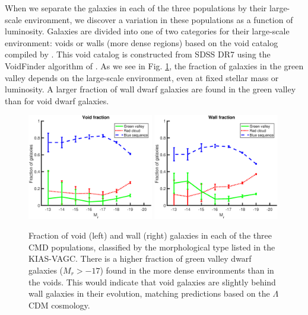 When we separate the galaxies in each of the three populations by their 
large-scale environment, we discover a variation in these populations as a 
function of luminosity.  Galaxies are divided into one of two categories for 
their large-scale environment: voids or walls (more dense regions) based on the 
void catalog compiled by \cite{Pan12}.  This void catalog is constructed from 
SDSS DR7 using the VoidFinder algorithm of \cite{Hoyle02}.  As we see in Fig. 
\ref{fig:Mr_bin}, the fraction of galaxies in the green valley depends on the 
large-scale environment, even at fixed stellar mass or luminosity.  A larger 
fraction of wall dwarf galaxies are found in the green valley than for void 
dwarf galaxies.

\begin{figure}
    \includegraphics[width=0.49\textwidth]{Images/GV/voidFrac_CMD}
    \includegraphics[width=0.49\textwidth]{Images/GV/wallFrac_CMD}
    \caption[Fraction of galaxies in CMD populations by morphological type]
    {Fraction of void (left) and wall (right) galaxies in each of the three CMD 
    populations, classified by the morphological type listed in the KIAS-VAGC.  
    There is a higher fraction of green valley dwarf galaxies ($M_r > -17$) 
    found in the more dense environments than in the voids.  This would indicate 
    that void galaxies are slightly behind wall galaxies in their evolution, 
    matching predictions based on the $\Lambda$CDM cosmology.}
    \label{fig:Mr_bin}
\end{figure}



